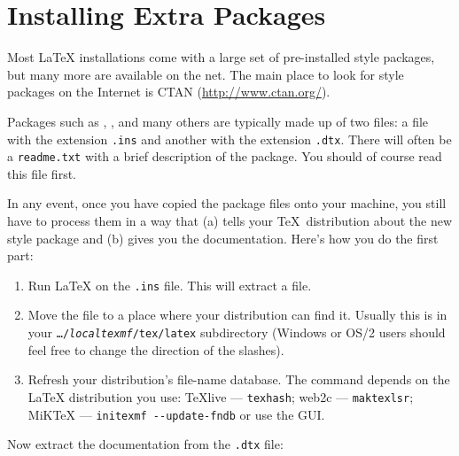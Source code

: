 \section{Installing Extra Packages}\label{sec:Packages}

Most \LaTeX{} installations come with a large set of pre-installed
style packages, but many more are available on the net. The main
place to look for style packages on the Internet is CTAN (\url{http://www.ctan.org/}).

Packages such as , , and many
others are typically made up of two files: a file with the extension
\texttt{.ins} and another with the extension \texttt{.dtx}. There
will often be a \texttt{readme.txt} with a brief description of the
package. You should of course read this file first.

In any event, once you have copied the package files onto your
machine, you still have to process them in a way that (a) tells your
\TeX\ distribution about the new style package and (b) gives you
the documentation.  Here's how you do the first part:

\begin{enumerate}
\item Run \LaTeX{} on the \texttt{.ins} file. This will
  extract a  file.
\item Move the  file to a place where your distribution
  can find it. Usually this is in your \texttt{\ldots/\emph{localtexmf}/tex/latex}
  subdirectory (Windows or OS/2 users should feel free to change the
  direction of the slashes).
\item Refresh your distribution's file-name database. The command
  depends on the \LaTeX{} distribution you use:
  \TeX{}live --- \texttt{texhash}; web2c --- \texttt{maktexlsr};
  MiK\TeX{} --- \texttt{initexmf -{}-update-fndb} or use the GUI\@.
\end{enumerate}

\noindent Now extract the documentation from the
\texttt{.dtx} file:

